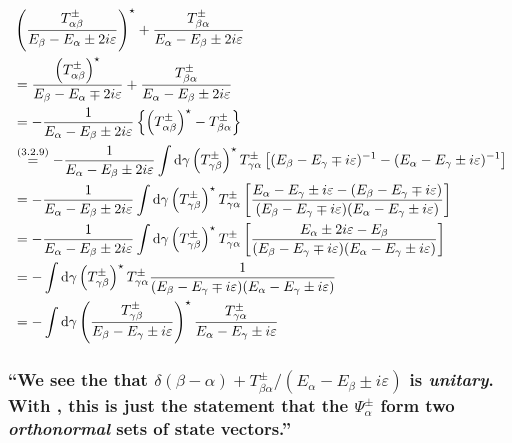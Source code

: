 \begin{widetext}
	\begin{align*}
		&\left(\dfrac{T_{\alpha\beta}^\pm}{E_\beta-E_\alpha\pm 2i\varepsilon}\right)^\star
		+\dfrac{T_{\beta\alpha}^\pm}{E_\alpha-E_\beta\pm 2i\varepsilon}\\
		&=\dfrac{\left(T_{\alpha\beta}^\pm\right)^\star}{E_\beta-E_\alpha\mp 2i\varepsilon}+\dfrac{T_{\beta\alpha}^\pm}{E_\alpha-E_\beta\pm 2i\varepsilon}\\
		&=-\dfrac{1}{E_\alpha-E_\beta\pm 2i\varepsilon}\left\{\left(T_{\alpha\beta}^\pm\right)^\star-T_{\beta\alpha}^\pm\right\}\\
		&\overset{({3.2.9})}{=}-\dfrac{1}{E_\alpha-E_\beta\pm 2i\varepsilon}\int\dd{\gamma}\left(T_{\gamma\beta}^\pm\right)^\star T_{\gamma\alpha}^\pm\left[(E_\beta-E_\gamma\mp i \varepsilon)^{-1}-(E_\alpha-E_\gamma\pm i \varepsilon)^{-1}\right]\\
		&=-\dfrac{1}{E_\alpha-E_\beta\pm 2i\varepsilon}\int\dd{\gamma}\left(T_{\gamma\beta}^\pm\right)^\star T_{\gamma\alpha}^\pm\left[\dfrac{E_\alpha-E_\gamma\pm i \varepsilon-(E_\beta-E_\gamma\mp i \varepsilon)}{(E_\beta-E_\gamma\mp i \varepsilon)(E_\alpha-E_\gamma\pm i \varepsilon)}\right]\\
		&=-\dfrac{1}{E_\alpha-E_\beta\pm 2i\varepsilon}\int\dd{\gamma}\left(T_{\gamma\beta}^\pm\right)^\star T_{\gamma\alpha}^\pm\left[\dfrac{E_\alpha\pm 2i \varepsilon-E_\beta}{(E_\beta-E_\gamma\mp i \varepsilon)(E_\alpha-E_\gamma\pm i \varepsilon)}\right]\\
		&=-\int\dd{\gamma}\left(T_{\gamma\beta}^\pm\right)^\star T_{\gamma\alpha}^\pm \dfrac{1}{(E_\beta-E_\gamma\mp i \varepsilon)(E_\alpha-E_\gamma\pm i \varepsilon)}\\
		&=-\int\dd{\gamma} \left(\dfrac{T_{\gamma\beta}^\pm}{E_\beta-E_\gamma\pm i \varepsilon}\right)^\star \dfrac{T_{\gamma\alpha}^\pm}{E_\alpha-E_\gamma\pm i \varepsilon}
	\end{align*}
	
	
\end{widetext}

\subsubsection{\enquote{We see the that $\delta(\beta-\alpha)+T_{\beta\alpha}^\pm/(E_\alpha-E_\beta\pm i \varepsilon)$ is \emph{unitary}. With , this is just the statement that the $\Psi_\alpha^\pm$ form two \emph{orthonormal} sets of state vectors.} }

